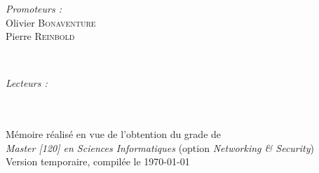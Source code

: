 \documentclass[a4paper, twoside, 12pt,french]{report}
\begin{document}
\begin{titlepage}
\begin{minipage}{0.4\textwidth}
\begin{flushleft} \large
\emph{Promoteurs :} \\
Olivier \textsc{Bonaventure}\\
Pierre \textsc{Reinbold}
\end{flushleft}
\end{minipage}
~
\begin{minipage}{0.4\textwidth}
\begin{flushright} \large
\emph{Lecteurs :} \\
 \textsc{}\\
 \textsc{}
\end{flushright}
\end{minipage}\\[1.5cm]


{\normalsize Mémoire réalisé en vue de l'obtention du grade de\\
\emph{Master [120] en Sciences Informatiques} (option \emph{Networking \& Security})}\\[1.5cm]

{\huge Version temporaire, compilée le \today}

\end{titlepage}

\pagestyle{empty} %
\tableofcontents
\restoregeometry
\clearpage %
\pagestyle{fancy}














\end{document}
